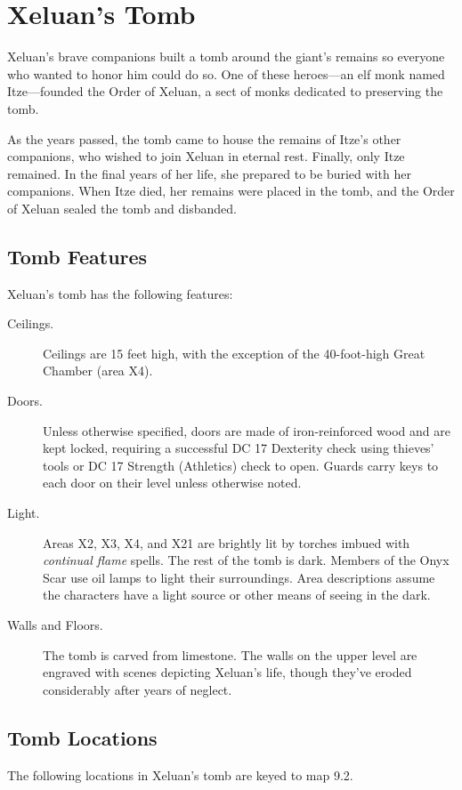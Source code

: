 \documentclass[10pt,a4paper,twoside,bg=print,twocolumn,openany,nodeprecatedcode]{dndbook}
\begin{document}
\section{Xeluan's Tomb}
Xeluan's brave companions built a tomb around the giant's remains so everyone who wanted to honor him could do so. One of these heroes—an elf monk named Itze—founded the Order of Xeluan, a sect of monks dedicated to preserving the tomb.

As the years passed, the tomb came to house the remains of Itze's other companions, who wished to join Xeluan in eternal rest. Finally, only Itze remained. In the final years of her life, she prepared to be buried with her companions. When Itze died, her remains were placed in the tomb, and the Order of Xeluan sealed the tomb and disbanded.

\subsection{Tomb Features}
Xeluan's tomb has the following features:


\begin{description}
\item[Ceilings.]
Ceilings are 15 feet high, with the exception of the 40-foot-high Great Chamber (area X4).
\item[Doors.]
Unless otherwise specified, doors are made of iron-reinforced wood and are kept locked, requiring a successful DC 17 Dexterity check using thieves' tools or DC 17 Strength (Athletics) check to open. Guards carry keys to each door on their level unless otherwise noted.
\item[Light.]
Areas X2, X3, X4, and X21 are brightly lit by torches imbued with \textit{continual flame} spells. The rest of the tomb is dark. Members of the Onyx Scar use oil lamps to light their surroundings. Area descriptions assume the characters have a light source or other means of seeing in the dark.
\item[Walls and Floors.]
The tomb is carved from limestone. The walls on the upper level are engraved with scenes depicting Xeluan's life, though they've eroded considerably after years of neglect.
\end{description}

\subsection{Tomb Locations}
The following locations in Xeluan's tomb are keyed to map 9.2.
\end{document}
